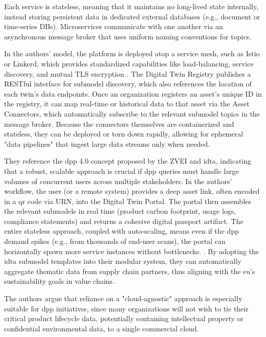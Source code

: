 Each service is stateless, meaning that it maintains no long-lived state internally, instead storing persistent data in dedicated external databases (e.g., document or time-series DBs). Microservices communicate with one another via an asynchronous message broker that uses uniform naming conventions for topics. \autocite{Redeker.2024}

In the authors’ model, the platform is deployed atop a service mesh, such as Istio or Linkerd, which provides standardized capabilities like load-balancing, service discovery, and mutual TLS encryption \autocite{Barr.2024}. The Digital Twin Registry publishes a RESTful interface for submodel discovery, which also references the location of each twin’s data endpoints. Once an organization registers an asset’s unique ID in the registry, it can map real-time or historical data to that asset via the Asset Connectors, which automatically subscribe to the relevant submodel topics in the message broker. Because the connectors themselves are containerized and stateless, they can be deployed or torn down rapidly, allowing for ephemeral "data pipelines" that ingest large data streams only when needed. \autocite{Redeker.2024}

They reference the \ac{dpp} 4.0 concept proposed by the ZVEI and \ac{idta}, indicating that a robust, scalable approach is crucial if \ac{dpp} queries must handle large volumes of concurrent users across multiple stakeholders. In the authors’ workflow, the user (or a remote system) provides a deep asset link, often encoded in a \ac{qr} code via URN, into the Digital Twin Portal. The portal then assembles the relevant submodels in real time (product carbon footprint, usage logs, compliance statements) and returns a cohesive digital passport artifact. The entire stateless approach, coupled with auto-scaling, means even if the \ac{dpp} demand spikes (e.g., from thousands of end-user scans), the portal can horizontally spawn more service instances without bottlenecks. . By adopting the \ac{idta} submodel templates into their modular system, they can automatically aggregate thematic data from supply chain partners, thus aligning with the \ac{eu}’s sustainability goals in value chains. \autocite{Redeker.2024, Garrels.2023}

The authors argue that reliance on a "cloud-agnostic" approach is especially suitable for \ac{dpp} initiatives, since many organizations will not wish to tie their critical product lifecycle data, potentially containing intellectual property or confidential environmental data, to a single commercial cloud.

